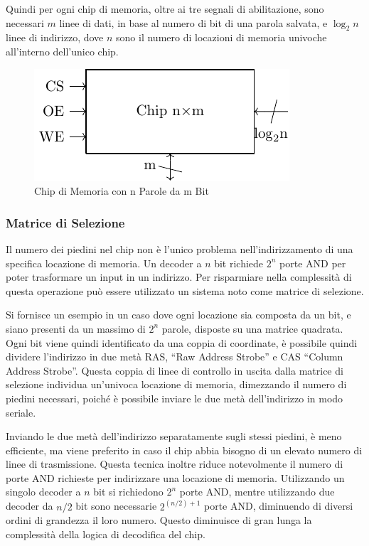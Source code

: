 \documentclass{article}
\numberwithin{equation}{subsection}
\begin{document}
Quindi per ogni chip di memoria, oltre ai tre segnali di abilitazione, sono necessari $m$ linee di dati, in base al numero di bit di una parola salvata, e $\log_2n$ linee di indirizzo, dove $n$ sono il numero di 
locazioni di memoria univoche all'interno dell'unico chip. 

\begin{figure}[H]%
    \centering
    \includegraphics{chip-memoria-compatto.pdf}%
    \caption{Chip di Memoria con n Parole da m Bit}%
\end{figure}
\subsubsection{Matrice di Selezione}

Il numero dei piedini nel chip non è l'unico problema nell'indirizzamento di una specifica locazione di memoria. Un decoder a $n$ bit richiede $2^n$ porte AND per poter trasformare un 
input in un indirizzo. Per risparmiare nella complessità di questa operazione può essere utilizzato un sistema noto come matrice di selezione. 

Si fornisce un esempio in un caso dove ogni locazione sia composta da un bit, e siano presenti da un massimo di $2^n$ parole, disposte su una matrice quadrata. Ogni bit viene quindi identificato da una coppia di 
coordinate, è possibile quindi dividere l'indirizzo in due metà RAS, ``Raw Address Strobe'' e CAS ``Column Address Strobe''. Questa coppia di linee di controllo in uscita dalla matrice di selezione individua 
un'univoca locazione di memoria, dimezzando il numero di piedini necessari, poiché è possibile inviare le due metà dell'indirizzo in modo seriale. 


Inviando le due metà dell'indirizzo separatamente sugli stessi piedini, è meno efficiente, ma viene preferito in caso il chip abbia bisogno di un elevato numero di linee di trasmissione. Questa tecnica inoltre 
riduce notevolmente il numero di porte AND richieste per indirizzare una locazione di memoria. Utilizzando un singolo decoder a $n$ bit si richiedono $2^n$ porte AND, mentre utilizzando due decoder da $n/2$ bit 
sono necessarie $2^{(n/2)+1}$ porte AND, diminuendo di diversi ordini di grandezza il loro numero. Questo diminuisce di gran lunga la complessità della logica di decodifica del chip. 
\end{document}
